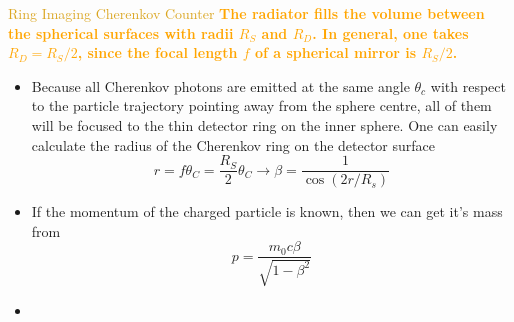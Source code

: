 \documentclass[11pt]{beamer} %
\renewcommand{\(}{\begin{columns}}
\renewcommand{\)}{\end{columns}}
\newcommand{\<}[1]{\begin{column}{#1}}
\renewcommand{\>}{\end{column}}
\newcommand{\itt}{\begin{itemize}}
\newcommand{\tti}{\end{itemize}}
\newcommand{\hlt}[2]{\textcolor{#1}{\textbf{#2}}}
\begin{document}
\begin{frame}{\textcolor{Goldenrod}{Ring Imaging Cherenkov Counter}}
  \hlt{Orange}{The radiator fills the volume between the spherical surfaces with
    radii $R_S$ and $R_D$. In general, one takes $R_D = R_S/2$, since the focal
    length $f$ of a spherical mirror is $R_S/2$.}
\itt
\item Because all Cherenkov photons
  are emitted at the same angle $\theta_c$ with respect to the particle
  trajectory pointing away from the sphere centre, all of them will be
  focused to the thin detector ring on the inner sphere. One can
  easily calculate the radius of the Cherenkov ring on the detector
  surface
  \[
    r  = f \theta_C = \frac{R_S}{2} \theta_C \to \beta = \frac{1}{\cos(2r/R_s)} 
  \]
\item  If the momentum of the charged particle is known, then
  we can get it's mass from
  \[
    p  = \frac{m_0 c \beta}{\sqrt{1 - \beta^2}}
  \]
\item 
  \tti
\end{frame} 
\end{document}
